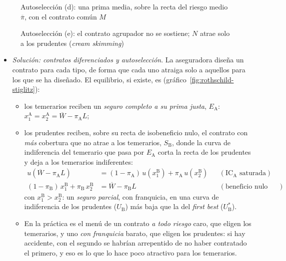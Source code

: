 \documentclass[11pt]{article}
\begin{document}
\begin{figure}[H]
\centering
\caption{Autoselección (d): una prima media, sobre la recta del riesgo medio $\overline{\pi}$, con el contrato común $M$}\label{fig:rs-d}
\end{figure}

\begin{figure}[H]
\centering
\caption{Autoselección (e): el contrato agrupador no se sostiene; $N$ atrae solo a los prudentes (\emph{cream skimming})}\label{fig:rs-agrupador}
\end{figure}

\begin{itemize}
\item \emph{Solución: contratos diferenciados y autoselección}. La aseguradora diseña un contrato para cada tipo, de forma que cada uno atraiga solo a aquellos para los que se ha diseñado. El equilibrio, si existe, es  (gráfico~\ref{fig:rothschild-stiglitz}):
  \begin{itemize}
  \item los temerarios reciben un \emph{seguro completo a su prima justa}, $E_{\mathrm{A}}$: $x_1^{\mathrm{A}}=x_2^{\mathrm{A}}=\overline{W}-\pi_{\mathrm{A}}L$;
  \item los prudentes reciben, sobre su recta de isobeneficio nulo, el contrato con \emph{más} cobertura que no atrae a los temerarios, $S_{\mathrm{B}}$, donde la curva de indiferencia del temerario que pasa por $E_{\mathrm{A}}$ corta la recta de los prudentes y deja a los temerarios indiferentes:
  \begin{equation}
  \begin{aligned}
  u(\overline{W}-\pi_{\mathrm{A}}L)&=(1-\pi_{\mathrm{A}})\,u(x_1^{\mathrm{B}})+\pi_{\mathrm{A}}\,u(x_2^{\mathrm{B}}) &&(\mathrm{IC}_{\mathrm{A}}\text{ saturada})\\
  (1-\pi_{\mathrm{B}})\,x_1^{\mathrm{B}}+\pi_{\mathrm{B}}\,x_2^{\mathrm{B}}&=\overline{W}-\pi_{\mathrm{B}}L &&(\text{beneficio nulo con los prudentes})
  \end{aligned}\label{eq:rs-separador}
  \end{equation}
  con $x_1^{\mathrm{B}}>x_2^{\mathrm{B}}$: un \emph{seguro parcial}, con franquicia, en una curva de indiferencia de los prudentes ($U_{\mathrm{B}}$) más baja que la del \emph{first best} ($U_{\mathrm{B}}^{*}$).
  \item En la práctica es el menú de un contrato \emph{a todo riesgo} caro, que eligen los temerarios, y uno \emph{con franquicia} barato, que eligen los prudentes: si hay accidente, con el segundo se habrían arrepentido de no haber contratado el primero, y eso es lo que lo hace poco atractivo para los temerarios.
  \end{itemize}
\end{itemize}
\end{document}
